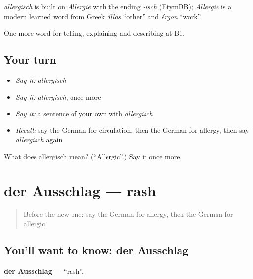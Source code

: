 \begin{cousinweb}
\emph{allergisch} is built on \emph{Allergie} with the ending \emph{-isch} (EtymDB); \emph{Allergie} is a modern learned word from Greek \emph{állos} \textquotedblleft{}other\textquotedblright{} and \emph{érgon} \textquotedblleft{}work\textquotedblright{}.
\end{cousinweb}

\begin{grammarlens}[title={What you've built}]
One more word for telling, explaining and describing at B1.
\end{grammarlens}

\subsection*{Your turn}
\begin{itemize}
\raggedright
  \item \emph{Say it:} \emph{allergisch}
  \item \emph{Say it:} \emph{allergisch}, once more
  \item \emph{Say it:} a sentence of your own with \emph{allergisch}
  \item \emph{Recall:} say the German for circulation, then the German for allergy, then say \emph{allergisch} again
\end{itemize}

\begin{tcolorbox}[breakable,colback=teal!4,colframe=teal!35!black,title={Before you move on}]
What does allergisch mean? (\textquotedblleft{}Allergic\textquotedblright{}.) Say it once more.
\end{tcolorbox}
\section[der Ausschlag]{der Ausschlag — rash}

\label{lesson:GE-C481-ausschlag}



\begin{quote}
Before the new one: say the German for allergy, then the German for allergic.
\end{quote}

\subsection*{You'll want to know: der Ausschlag}
\textbf{der Ausschlag} — \textquotedblleft{}rash\textquotedblright{}.

